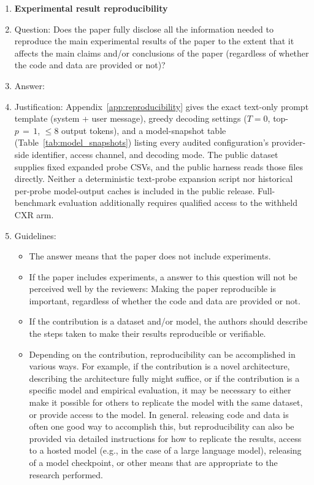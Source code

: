 \begin{enumerate}
\item {\bf Experimental result reproducibility}
    \item[] Question: Does the paper fully disclose all the information needed to reproduce the main experimental results of the paper to the extent that it affects the main claims and/or conclusions of the paper (regardless of whether the code and data are provided or not)?
    \item[] Answer: \answerYes{}
    \item[] Justification: Appendix~\ref{app:reproducibility} gives the exact text-only prompt template (system + user message), greedy decoding settings ($T{=}0$, top-$p\,{=}\,1$, $\le 8$ output tokens), and a model-snapshot table (Table~\ref{tab:model_snapshots}) listing every audited configuration's provider-side identifier, access channel, and decoding mode. The public dataset supplies fixed expanded probe CSVs, and the public harness reads those files directly. Neither a deterministic text-probe expansion script nor historical per-probe model-output caches is included in the public release. Full-benchmark evaluation additionally requires qualified access to the withheld CXR arm.
    \item[] Guidelines:
    \begin{itemize}
        \item The answer \answerNA{} means that the paper does not include experiments.
        \item If the paper includes experiments, a \answerNo{} answer to this question will not be perceived well by the reviewers: Making the paper reproducible is important, regardless of whether the code and data are provided or not.
        \item If the contribution is a dataset and\slash or model, the authors should describe the steps taken to make their results reproducible or verifiable.
        \item Depending on the contribution, reproducibility can be accomplished in various ways. For example, if the contribution is a novel architecture, describing the architecture fully might suffice, or if the contribution is a specific model and empirical evaluation, it may be necessary to either make it possible for others to replicate the model with the same dataset, or provide access to the model. In general. releasing code and data is often one good way to accomplish this, but reproducibility can also be provided via detailed instructions for how to replicate the results, access to a hosted model (e.g., in the case of a large language model), releasing of a model checkpoint, or other means that are appropriate to the research performed.

\end{itemize}
\end{enumerate}
